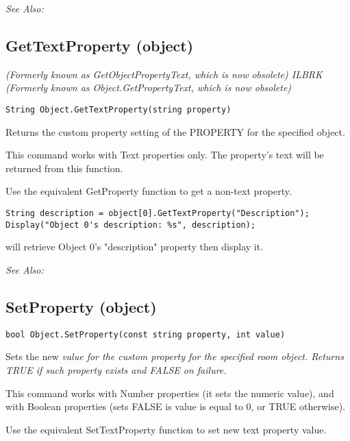 \it{See Also:} 


\subsection{GetTextProperty (object)}\label{Object.GetTextProperty}%

\it{(Formerly known as GetObjectPropertyText, which is now obsolete)} ILBRK
\it{(Formerly known as Object.GetPropertyText, which is now obsolete)}

\begin{verbatim}
String Object.GetTextProperty(string property)
\end{verbatim}
Returns the custom property setting of the PROPERTY for the specified object.

This command works with Text properties only. The property's text will be
returned from this function.

Use the equivalent GetProperty function to get a non-text property.

\begin{verbatim}
String description = object[0].GetTextProperty("Description");
Display("Object 0's description: %s", description);
\end{verbatim}
will retrieve Object 0's "description" property then display it.

\it{See Also:} 


\subsection{SetProperty (object)}\label{Object.SetProperty}%

\begin{verbatim}
bool Object.SetProperty(const string property, int value)
\end{verbatim}
Sets the new \it{value} for the custom \it{property} for the specified room object. Returns
TRUE if such property exists and FALSE on failure.

This command works with Number properties (it sets the numeric value), and with Boolean
properties (sets FALSE is value is equal to 0, or TRUE otherwise).

Use the equivalent SetTextProperty function to set new text property value.

